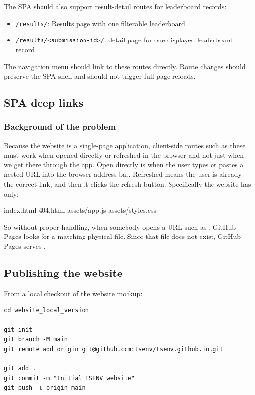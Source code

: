 \documentclass[11pt]{article}
\begin{document}
The SPA should also support result-detail routes for leaderboard records:

\begin{itemize}
    \item \texttt{/results/}: Results page with one filterable leaderboard
    \item \texttt{/results/\textless submission-id\textgreater/}: detail page for one displayed leaderboard record
\end{itemize}

The navigation menu should link to these routes directly.
Route changes should preserve the SPA shell and should not trigger full-page reloads.

\subsection*{SPA deep links}

\subsubsection*{Background of the problem}
Because the website is a single-page application, client-side routes such as these must work when opened directly or refreshed in the browser and not just when we get there through the app. 
Open directly is when the user types or pastes a nested URL into the browser address bar.
Refreshed means the user is already the correct link, and then it clicks the refresh button.
Specifically the website has only:
\begin{DocCode}
  index.html
  404.html
  assets/app.js
  assets/styles.css
\end{DocCode}
So without proper handling, when somebody opens a URL such as , GitHub Pages looks for a matching physical file. 
Since that file does not exist, GitHub Pages serves .


\subsection*{Publishing the website}

From a local checkout of the website mockup:

\begin{verbatim}
cd website_local_version

git init
git branch -M main
git remote add origin git@github.com:tsenv/tsenv.github.io.git

git add .
git commit -m "Initial TSENV website"
git push -u origin main
\end{verbatim}
\end{document}
